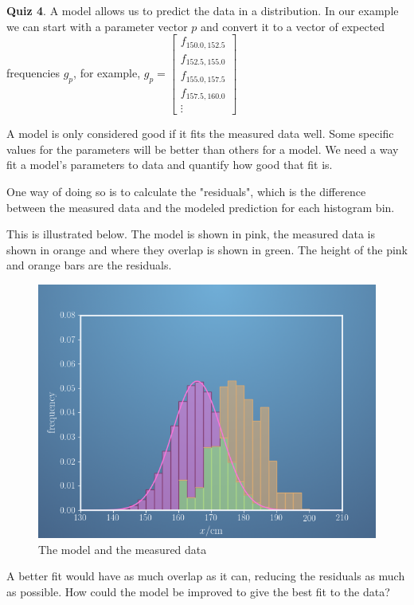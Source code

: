 \documentclass[]{article}
\begin{document}
\textbf{Quiz 4}. A model allows us to predict the data in a distribution. In our example we can start with a parameter vector $ p $ and convert it to a vector of expected frequencies $ g_p $, for example, $ g_p =
\begin{bmatrix}
	f_{150.0, 152.5} \\
	f_{152.5, 155.0} \\
	f_{155.0, 157.5} \\
	f_{157.5, 160.0} \\
	\vdots
\end{bmatrix} $

A model is only considered good if it fits the measured data well. Some specific values for the parameters will be better than others for a model. We need a way fit a model's parameters to data and quantify how good that fit is.

One way of doing so is to calculate the "residuals", which is the difference between the measured data and the modeled prediction for each histogram bin.

This is illustrated below. The model is shown in pink, the measured data is shown in orange and where they overlap is shown in green. The height of the pink and orange bars are the residuals.

\begin{figure}[h]
	\centering
	\includegraphics[width=\textwidth]{residuals}
	\caption{The model and the measured data}
	\label{fig:residuals}
\end{figure}

A better fit would have as much overlap as it can, reducing the residuals as much as possible. How could the model be improved to give the best fit to the data?
\end{document}
